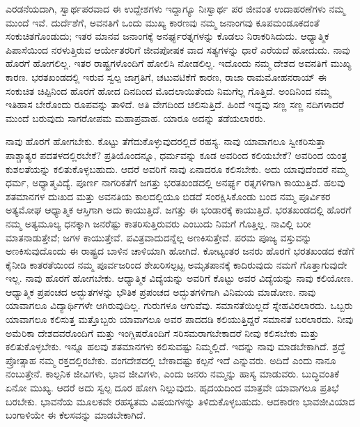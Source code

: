 ಎರಡನೆಯದಾಗಿ, ಸ್ವಾರ್ಥಪರವಾದ ಈ ಉದ್ದೇಶಗಳು ಇದ್ದಾಗ್ಯೂ ನಿಃಸ್ವಾರ್ಥ ಪರ ಜೀವಂತ ಉದಾಹರಣೆಗಳು ನಮ್ಮ ಮುಂದೆ ಇವೆ. ದುರ್ದೆಶೆಗೆ, ಅವನತಿಗೆ ಒಂದು ಮುಖ್ಯ ಕಾರಣವು ನಮ್ಮ ಜನಾಂಗವು ಕೂಪಮಂಡೂಕದಂತೆ ಸಂಕುಚಿತಗೊಂಡುದು; ಇತರ ಮಾನವ ಜನಾಂಗಕ್ಕೆ ಅನರ್ಘ್ಯರತ್ನಗಳನ್ನು ಕೊಡಲು ನಿರಾಕರಿಸಿದುದು. ಆಧ್ಯಾತ್ಮಿಕ ಪಿಪಾಸೆಯಿಂದ ನರಳುತ್ತಿರುವ ಆರ್ಯೇತರರಿಗೆ ಜೀವಪೋಷಕ ವಾದ ಸತ್ಯಗಳನ್ನು ಧಾರೆ ಎರೆಯದೆ ಹೋದುದು. ನಾವು ಹೊರಗೆ ಹೋಗಲಿಲ್ಲ. ಇತರ ರಾಷ್ಟ್ರಗಳೊಂದಿಗೆ ಹೋಲಿಸಿ ನೋಡಲಿಲ್ಲ. ಇದೊಂದು ನಮ್ಮ ದೇಶದ ಅವನತಿಗೆ ಮುಖ್ಯ ಕಾರಣ. ಭರತಖಂಡದಲ್ಲಿ ಇರುವ ಸ್ವಲ್ಪ ಜಾಗ್ರತಿಗೆ, ಚಟುವಟಿಕೆಗೆ ಕಾರಣ, ರಾಜಾ ರಾಮಮೋಹನರಾಯ್​ ಈ ಸಂಕುಚಿತ ಚಿಪ್ಪಿನಿಂದ ಹೊರಗೆ ಹೋದ ದಿನದಿಂದ ಮೊದಲಾಯಿತೆಂದು ನಿಮಗೆಲ್ಲ ಗೊತ್ತಿದೆ. ಅಂದಿನಿಂದ ನಮ್ಮ ಇತಿಹಾಸ ಬೇರೊಂದು ರೂಪವನ್ನು ತಾಳಿದೆ. ಅತಿ ವೇಗದಿಂದ ಚಲಿಸುತ್ತಿದೆ. ಹಿಂದೆ ಇದ್ದವು ಸಣ್ಣ ಸಣ್ಣ ನದಿಗಳಾದರೆ ಮುಂದೆ ಬರುವುದು ಸಾಗರೋಪಮ ಮಹಾಪ್ರವಾಹ. ಯಾರೂ ಅದನ್ನು ತಡೆಯಲಾರರು.

ನಾವು ಹೊರಗೆ ಹೋಗಬೇಕು. ಕೊಟ್ಟು ತೆಗೆದುಕೊಳ್ಳುವುದರಲ್ಲಿದೆ ರಹಸ್ಯ. ನಾವು ಯಾವಾಗಲೂ ಸ್ವೀಕರಿಸುತ್ತಾ ಪಾಶ್ಚಾತ್ಯರ ಪದತಳದಲ್ಲಿರಬೇಕೆ? ಪ್ರತಿಯೊಂದನ್ನೂ, ಧರ್ಮವನ್ನು ಕೂಡ ಅವರಿಂದ ಕಲಿಯಬೇಕೆ? ಅವರಿಂದ ಯಂತ್ರ ಕುಶಲತೆಯನ್ನು ಕಲಿತುಕೊಳ್ಳಬಹುದು. ಆದರೆ ಅವರಿಗೆ ನಾವು ಏನಾದರೂ ಕಲಿಸಬೇಕು. ಅದು ಯಾವುದೆಂದರೆ ನಮ್ಮ ಧರ್ಮ, ಅಧ್ಯಾತ್ಮವಿದ್ಯೆ. ಪೂರ್ಣ ನಾಗರಿಕತೆಗೆ ಜಗತ್ತು ಭರತಖಂಡದಲ್ಲಿ ಅನರ್ಘ್ಯ ರತ್ನಗಳಿಗಾಗಿ ಕಾಯುತ್ತಿದೆ. ಹಲವು ಶತಮಾನಗಳ ದುಃಖದ ಮತ್ತು ಅವನತಿಯ ಕಾಲದಲ್ಲಿಯೂ ಬಿಡದೆ ಸಂರಕ್ಷಿಸಿಕೊಂಡು ಬಂದ ನಮ್ಮ ಪೂರ್ವಿಕರ ಅತ್ಯಮೋಘ ಆಧ್ಯಾತ್ಮಿಕ ಆಸ್ತಿಗಾಗಿ ಅದು ಕಾಯುತ್ತಿದೆ. ಜಗತ್ತು ಈ ಭಂಡಾರಕ್ಕೆ ಕಾಯುತ್ತಿದೆ. ಭರತಖಂಡದಲ್ಲಿ ಹೊರಗೆ ನಮ್ಮ ಅತ್ಯಮೂಲ್ಯ ಧನಕ್ಕಾಗಿ ಜನರೆಷ್ಟು ಕಾತರಿಸುತ್ತಿರುವರು ಎಂಬುದು ನಿಮಗೆ ಗೊತ್ತಿಲ್ಲ. ನಾವಿಲ್ಲಿ ಬರೀ ಮಾತನಾಡುತ್ತೇವೆ; ಜಗಳ ಕಾಯುತ್ತೇವೆ. ಪವಿತ್ರವಾದುದನ್ನೆಲ್ಲ ಅಣಕಿಸುತ್ತೇವೆ. ಪರಮ ಪೂಜ್ಯ ವಸ್ತುವನ್ನು ಅಣಕಿಸುವುದೊಂದು ಈ ರಾಷ್ಟ್ರದ ಬಾಳಿನ ಚಾಳಿಯಾಗಿ ಹೋಗಿದೆ. ಕೋಟ್ಯಂತರ ಜನರು ಹೊರಗೆ ಭರತಖಂಡದ ಕಡೆಗೆ ಕೈನೀಡಿ ಕಾತರತೆಯಿಂದ ನಮ್ಮ ಪೂರ್ವಜರಿಂದ ಶೇಖರಿಸಲ್ಪಟ್ಟ ಅಮೃತಪಾನಕ್ಕೆ ಕಾದಿರುವುದು ನಮಗೆ ಗೊತ್ತಾಗುವುದೇ ಇಲ್ಲ. ನಾವು ಹೊರಗೆ ಹೋಗಬೇಕು. ಆಧ್ಯಾತ್ಮಿಕ ವಿದ್ಯೆಯನ್ನು ಅವರಿಗೆ ಕೊಟ್ಟು ಅವರ ವಿದ್ಯೆಯನ್ನು ನಾವು ಕಲಿಯೋಣ. ಆಧ್ಯಾತ್ಮಿಕ ಪ್ರಪಂಚದ ಅದ್ಭುತಗಳನ್ನು ಭೌತಿಕ ಪ್ರಪಂಚದ ಅದ್ಭುತಗಳಿಗಾಗಿ ವಿನಿಮಯ ಮಾಡೋಣ. ನಾವು ಯಾವಾಗಲೂ ವಿದ್ಯಾರ್ಥಿಗಳೇ ಆಗಿರುವುದಿಲ್ಲ. ಗುರುಗಳೂ ಆಗುವೆವು. ಸಮಾನತೆಯಿಲ್ಲದೆ ಸ್ನೇಹವಿರಲಾರದು. ಒಬ್ಬರು ಯಾವಾಗಲೂ ಕಲಿಸುತ್ತ ಮತ್ತೊಬ್ಬರು ಯಾವಾಗಲೂ ಅವರ ಪಾದದಡಿ ಕಲಿಯುತ್ತಿದ್ದರೆ ಸಮಾನತೆ ಬರಲಾರದು. ನೀವು ಅಮೆರಿಕಾ ದೇಶದವರೊಂದಿಗೆ ಮತ್ತು ಇಂಗ್ಲಿಷರೊಂದಿಗೆ ಸರಿಸಮರಾಗಬೇಕಾದರೆ ನೀವು ಕಲಿಸಬೇಕು ಮತ್ತು ಕಲಿತುಕೊಳ್ಳಬೇಕು. ಇನ್ನೂ ಹಲವು ಶತಮಾನಗಳು ಕಲಿಸುವಷ್ಟು ನಿಮ್ಮಲ್ಲಿದೆ. ಇದನ್ನು ನಾವು ಮಾಡಬೇಕಾಗಿದೆ. ಶ್ರದ್ಧೆ ಪ್ರೋತ್ಸಾಹ ನಮ್ಮ ರಕ್ತದಲ್ಲಿರಬೇಕು. ವಂಗದೇಶದಲ್ಲಿ ಬೇಕಾದಷ್ಟು ಕಲ್ಪನೆ ಇದೆ ಎನ್ನುವರು. ಅದಿದೆ ಎಂದು ನಾನೂ ನಂಬುತ್ತೇನೆ. ಕಾಲ್ಪನಿಕ ಜೀವಿಗಳು, ಭಾವ ಜೀವಿಗಳು, ಎಂದು ಜನರು ನಮ್ಮನ್ನು ಹಾಸ್ಯ ಮಾಡುವರು. ಬುದ್ಧಿವಂತಿಕೆ ಏನೋ ಮುಖ್ಯ. ಆದರೆ ಅದು ಸ್ವಲ್ಪ ದೂರ ಹೋಗಿ ನಿಲ್ಲುವುದು. ಹೃದಯದಿಂದ ಮಾತ್ರವೇ ಯಾವಾಗಲೂ ಪ್ರತಿಭೆ ಬರಬೇಕು. ಭಾವನೆಯ ಮೂಲಕವೇ ರಹಸ್ಯತಮ ವಿಷಯಗಳನ್ನು ತಿಳಿದುಕೊಳ್ಳಬಹುದು. ಆದಕಾರಣ ಭಾವಜೀವಿಯಾದ ಬಂಗಾಳಿಯೇ ಈ ಕೆಲಸವನ್ನು ಮಾಡಬೇಕಾಗಿದೆ.

